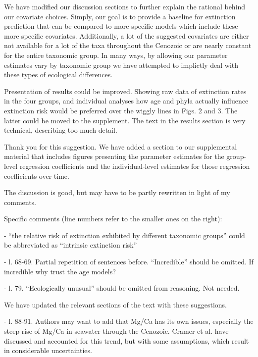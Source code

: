 \documentclass[12pt,letterpaper]{article}
\begin{document}
\begin{refsection}
We have modified our discussion sections to further explain the rational behind our covariate choices. Simply, our goal is to provide a baseline for extinction prediction that can be compared to more specific models which include these more specific covariates. Additionally, a lot of the suggested covariates are either not available for a lot of the taxa throughout the Cenozoic or are nearly constant for the entire taxonomic group. In many ways, by allowing our parameter estimates vary by taxonomic group we have attempted to implictly deal with these types of ecological differences.

\begin{bfseries}
  Presentation of results could be improved. Showing raw data of extinction rates in the four groups, and individual analyses how age and phyla actually influence extinction risk would be preferred over the wiggly lines in Figs. 2 and 3. The latter could be moved to the supplement. The text in the results section is very technical, describing too much detail. 
\end{bfseries}

Thank you for this suggestion. We have added a section to our supplemental material that includes figures presenting the parameter estimates for the group-level regression coefficients and the individual-level estimates for those regression coefficients over time. 

\begin{bfseries}
  The discussion is good, but may have to be partly rewritten in light of my comments. 

  Specific comments (line numbers refer to the smaller ones on the right):

  - “the relative risk of extinction exhibited by different taxonomic groups” could be abbreviated as “intrinsic extinction risk”

  - l. 68-69. Partial repetition of sentences before. “Incredible” should be omitted. If incredible why trust the age models?

  - l. 79. “Ecologically unusual” should be omitted from reasoning. Not needed. 
\end{bfseries}

We have updated the relevant sections of the text with these suggestions.

\begin{bfseries}
  - l. 88-91. Authors may want to add that Mg/Ca has its own issues, especially the steep rise of Mg/Ca in seawater through the Cenozoic. Cramer et al. have discussed and accounted for this trend, but with some assumptions, which result in considerable uncertainties.
\end{bfseries}


\end{refsection}
\end{document}
